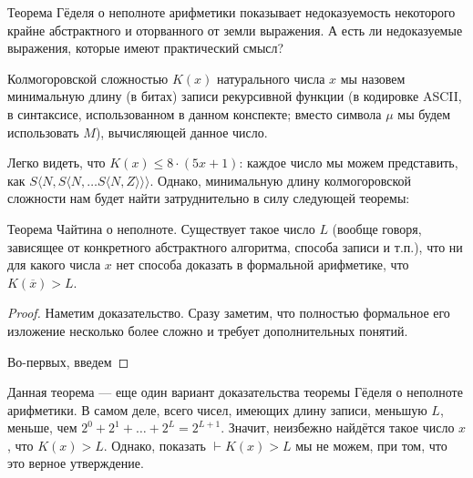 Теорема Гёделя о неполноте арифметики показывает недоказуемость некоторого крайне абстрактного и 
оторванного от земли выражения. А есть ли недоказуемые выражения, которые имеют практический смысл?

\begin{definition}Колмогоровской сложностью $K(x)$ натурального числа $x$ мы назовем 
минимальную длину (в битах) записи рекурсивной функции (в кодировке ASCII, в синтаксисе,
использованном в данном конспекте; вместо символа $\mu$ мы будем использовать $M$), 
вычисляющей данное число.
\end{definition}

Легко видеть, что $K(x) \le 8\cdot(5x + 1)$: каждое число мы можем представить, как
$S \langle N, S \langle N, \dots S \langle N,Z \rangle \rangle \rangle$.
Однако, минимальную длину колмогоровской сложности нам будет найти затруднительно 
в силу следующей теоремы:

\begin{theorem}Теорема Чайтина о неполноте. Существует такое число $L$ (вообще говоря,
зависящее от конкретного абстрактного алгоритма, способа записи и т.п.), что
ни для какого числа $x$ нет способа доказать в формальной арифметике, что 
$K(\overline{x}) > L$.
\end{theorem}

\begin{proof}
Наметим доказательство. Сразу заметим, что полностью формальное его изложение несколько более
сложно и требует дополнительных понятий.

Во-первых, введем 
\end{proof}

Данная теорема --- еще один вариант доказательства теоремы Гёделя о неполноте арифметики. 
В самом деле, всего чисел, имеющих длину записи, меньшую $L$, меньше, чем $2^0+2^1+\dots+2^L=2^{L+1}$.
Значит, неизбежно найдётся такое число $x$, что $K(x) > L$. Однако, показать
$\vdash K(x) > L$ мы не можем, при том, что это верное утверждение.

